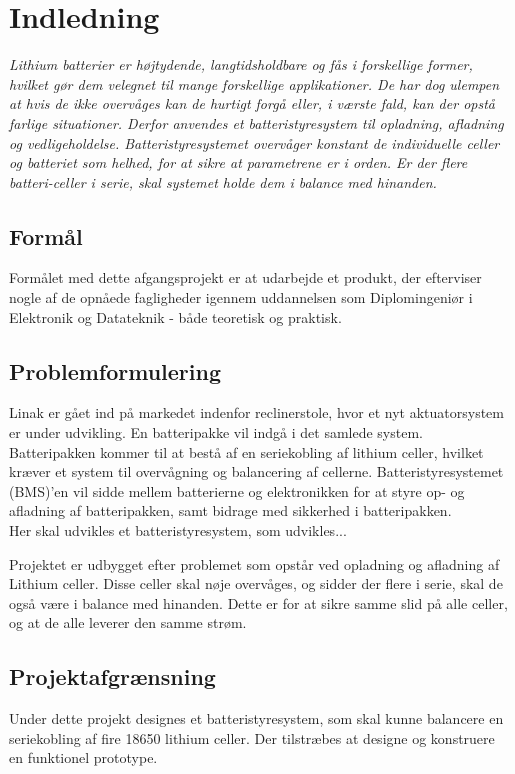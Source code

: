 \chapter{Indledning}

\emph{Lithium batterier er højtydende, langtidsholdbare og fås i forskellige former, hvilket gør dem velegnet til mange forskellige applikationer. De har dog ulempen at hvis de ikke overvåges kan de hurtigt forgå eller, i værste fald, kan der opstå farlige situationer. Derfor anvendes et batteristyresystem til opladning, afladning og vedligeholdelse. Batteristyresystemet overvåger konstant de individuelle celler og batteriet som helhed, for at sikre at parametrene er i orden. Er der flere batteri-celler i serie, skal systemet holde dem i balance med hinanden. }

\section{Formål}
Formålet med dette afgangsprojekt er at udarbejde et produkt, der efterviser nogle af de opnåede fagligheder igennem uddannelsen som Diplomingeniør i Elektronik og Datateknik - både teoretisk og praktisk.

\section{Problemformulering}
Linak er gået ind på markedet indenfor reclinerstole, hvor et nyt aktuatorsystem er under udvikling. En batteripakke vil indgå i det samlede system. Batteripakken kommer til at bestå af en seriekobling af lithium celler, hvilket kræver et system til overvågning og balancering af cellerne. Batteristyresystemet (BMS)’en vil sidde mellem batterierne og elektronikken for at styre op- og afladning af batteripakken, samt bidrage med sikkerhed i batteripakken. \\

Her skal udvikles et batteristyresystem, som udvikles...


Projektet er udbygget efter problemet som opstår ved opladning og afladning af Lithium celler. Disse celler skal nøje overvåges, og sidder der flere i serie, skal de også være i balance med hinanden. Dette er for at sikre samme slid på alle celler, og at de alle leverer den samme strøm. 

\section{Projektafgrænsning}
Under dette projekt designes et batteristyresystem, som skal kunne balancere en seriekobling af fire 18650 lithium celler. Der tilstræbes at designe og konstruere en funktionel prototype.
